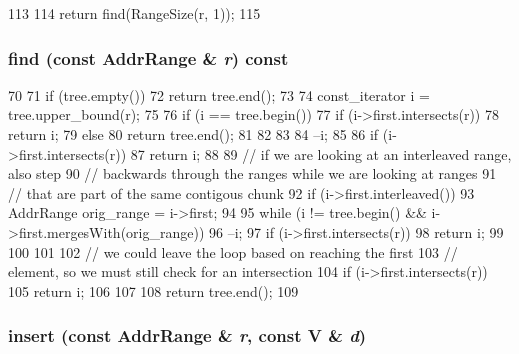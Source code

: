 \begin{DoxyCode}
113     {
114         return find(RangeSize(r, 1));
115     }
\end{DoxyCode}
\hypertarget{classAddrRangeMap_aa89a64932a83b0166c2d0ef2c3427473}{
\subsubsection[{find}]{ find (const {\bf AddrRange} \& {\em r}) const}}
\label{classAddrRangeMap_aa89a64932a83b0166c2d0ef2c3427473}



\begin{DoxyCode}
70     {
71         if (tree.empty())
72             return tree.end();
73 
74         const_iterator i = tree.upper_bound(r);
75 
76         if (i == tree.begin()) {
77             if (i->first.intersects(r)) {
78                 return i;
79             } else {
80                 return tree.end();
81             }
82         }
83 
84         --i;
85 
86         if (i->first.intersects(r))
87             return i;
88 
89         // if we are looking at an interleaved range, also step
90         // backwards through the ranges while we are looking at ranges
91         // that are part of the same contigous chunk
92         if (i->first.interleaved()) {
93             AddrRange orig_range = i->first;
94 
95             while (i != tree.begin() && i->first.mergesWith(orig_range)) {
96                 --i;
97                 if (i->first.intersects(r)) {
98                     return i;
99                 }
100             }
101 
102             // we could leave the loop based on reaching the first
103             // element, so we must still check for an intersection
104             if (i->first.intersects(r))
105                 return i;
106         }
107 
108         return tree.end();
109     }
\end{DoxyCode}
\hypertarget{classAddrRangeMap_ae464dba77c85b35e01680a92bd80b4cd}{
\subsubsection[{insert}]{ insert (const {\bf AddrRange} \& {\em r}, \/  const V \& {\em d})}}
\label{classAddrRangeMap_ae464dba77c85b35e01680a92bd80b4cd}



